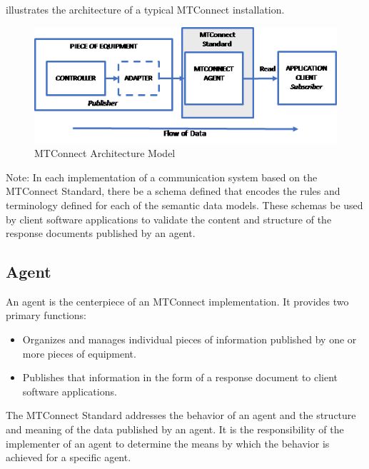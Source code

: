  illustrates the architecture of a typical MTConnect installation. 

\begin{figure}[ht]
  \centering
  \includegraphics[width=1.0\textwidth]{figures/mtconnect-architecture-model.png}
  \caption{MTConnect Architecture Model}
  \label{fig:mtconnect-architecture-model}
\end{figure}

\FloatBarrier

\begin{note}
Note: In each implementation of a communication system based on the MTConnect Standard, there \MUST be a schema defined that encodes the rules and terminology defined for each of the \glspl{semantic data model}.  These schemas \MAY be used by client software applications to validate the content and structure of the \glspl{response document} published by an \gls{agent}.

\end{note}

\subsection{Agent}

An \gls{agent} is the centerpiece of an MTConnect implementation.  It provides two primary functions:

\begin{itemize}

\item Organizes and manages individual pieces of information published by one or more pieces of equipment.

\item Publishes that information in the form of a \gls{response document} to client software applications.

\end{itemize}

The MTConnect Standard addresses the behavior of an \gls{agent} and the structure and meaning of the data published by an \gls{agent}.  It is the responsibility of the implementer of an \gls{agent} to determine the means by which the behavior is achieved for a specific \gls{agent}.

